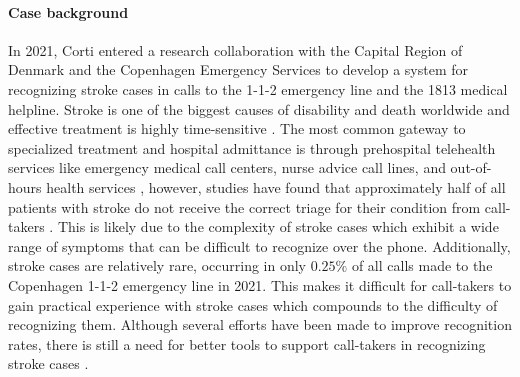 \paragraph{Case background} In 2021, Corti entered a research collaboration with the Capital Region of Denmark and the Copenhagen Emergency Services to develop a system for recognizing stroke cases in calls to the 1-1-2 emergency line and the 1813 medical helpline. 
Stroke is one of the biggest causes of disability and death worldwide \parencite{cite1,cite2,cite3} and effective treatment is highly time-sensitive \parencite{cite4,cite5}. The most common gateway to specialized treatment and hospital admittance is through prehospital telehealth services like emergency medical call centers, nurse advice call lines, and out-of-hours health services \parencite{cite6,cite7}, however, studies have found that approximately half of all patients with stroke do not receive the correct triage for their condition from call-takers \parencite{cite10,cite11,cite12}. 
This is likely due to the complexity of stroke cases which exhibit a wide range of symptoms that can be difficult to recognize over the phone. Additionally, stroke cases are relatively rare, occurring in only $0.25\%$ of all calls made to the Copenhagen 1-1-2 emergency line in 2021. This makes it difficult for call-takers to gain practical experience with stroke cases which compounds to the difficulty of recognizing them. Although several efforts have been made to improve recognition rates, there is still a need for better tools to support call-takers in recognizing stroke cases \parencite{cite13,cite14,cite15}.

